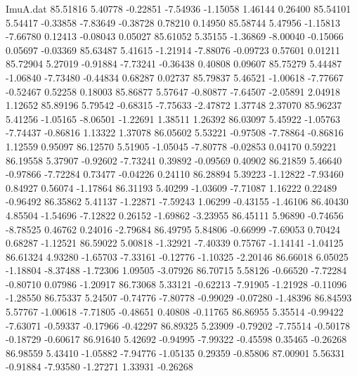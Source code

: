 \begin{filecontents}{ImuA.dat}
  85.51816    5.40778   -0.22851   -7.54936   -1.15058    1.46144    0.26400
  85.54101    5.54417   -0.33858   -7.83649   -0.38728    0.78210    0.14950
  85.58744    5.47956   -1.15813   -7.66780    0.12413   -0.08043    0.05027
  85.61052    5.35155   -1.36869   -8.00040   -0.15066    0.05697   -0.03369
  85.63487    5.41615   -1.21914   -7.88076   -0.09723    0.57601    0.01211
  85.72904    5.27019   -0.91884   -7.73241   -0.36438    0.40808    0.09607
  85.75279    5.44487   -1.06840   -7.73480   -0.44834    0.68287    0.02737
  85.79837    5.46521   -1.00618   -7.77667   -0.52467    0.52258    0.18003
  85.86877    5.57647   -0.80877   -7.64507   -2.05891    2.04918    1.12652
  85.89196    5.79542   -0.68315   -7.75633   -2.47872    1.37748    2.37070
  85.96237    5.41256   -1.05165   -8.06501   -1.22691    1.38511    1.26392
  86.03097    5.45922   -1.05763   -7.74437   -0.86816    1.13322    1.37078
  86.05602    5.53221   -0.97508   -7.78864   -0.86816    1.12559    0.95097
  86.12570    5.51905   -1.05045   -7.80778   -0.02853    0.04170    0.59221
  86.19558    5.37907   -0.92602   -7.73241    0.39892   -0.09569    0.40902
  86.21859    5.46640   -0.97866   -7.72284    0.73477   -0.04226    0.24110
  86.28894    5.39223   -1.12822   -7.93460    0.84927    0.56074   -1.17864
  86.31193    5.40299   -1.03609   -7.71087    1.16222    0.22489   -0.96492
  86.35862    5.41137   -1.22871   -7.59243    1.06299   -0.43155   -1.46106
  86.40430    4.85504   -1.54696   -7.12822    0.26152   -1.69862   -3.23955
  86.45111    5.96890   -0.74656   -8.78525    0.46762    0.24016   -2.79684
  86.49795    5.84806   -0.66999   -7.69053    0.70424    0.68287   -1.12521
  86.59022    5.00818   -1.32921   -7.40339    0.75767   -1.14141   -1.04125
  86.61324    4.93280   -1.65703   -7.33161   -0.12776   -1.10325   -2.20146
  86.66018    6.05025   -1.18804   -8.37488   -1.72306    1.09505   -3.07926
  86.70715    5.58126   -0.66520   -7.72284   -0.80710    0.07986   -1.20917
  86.73068    5.33121   -0.62213   -7.91905   -1.21928   -0.11096   -1.28550
  86.75337    5.24507   -0.74776   -7.80778   -0.99029   -0.07280   -1.48396
  86.84593    5.57767   -1.00618   -7.71805   -0.48651    0.40808   -0.11765
  86.86955    5.35514   -0.99422   -7.63071   -0.59337   -0.17966   -0.42297
  86.89325    5.23909   -0.79202   -7.75514   -0.50178   -0.18729   -0.60617
  86.91640    5.42692   -0.94995   -7.99322   -0.45598    0.35465   -0.26268
  86.98559    5.43410   -1.05882   -7.94776   -1.05135    0.29359   -0.85806
  87.00901    5.56331   -0.91884   -7.93580   -1.27271    1.33931   -0.26268

\end{filecontents}
